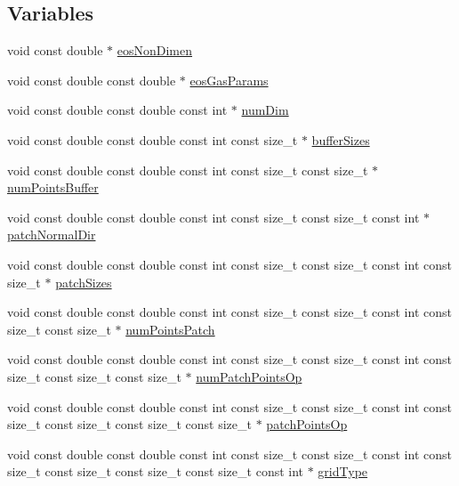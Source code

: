 \subsection*{Variables}
\begin{DoxyCompactItemize}
\item 
void const double $\ast$ \hyperlink{SATKernels_8H_a4278be352a3267641eaae6198afb804a}{eos\+Non\+Dimen}
\item 
void const double const double $\ast$ \hyperlink{SATKernels_8H_ac8bfd00975838fc342c281f3fd053090}{eos\+Gas\+Params}
\item 
void const double const double const int $\ast$ \hyperlink{SATKernels_8H_a680185db8546de161968dabace9e94f1}{num\+Dim}
\item 
void const double const double const int const size\+\_\+t $\ast$ \hyperlink{SATKernels_8H_a74eeadd5b4c053a55bbae02e9e6d690d}{buffer\+Sizes}
\item 
void const double const double const int const size\+\_\+t const size\+\_\+t $\ast$ \hyperlink{SATKernels_8H_a763eadbfec63ff273e2d7b16b0b05974}{num\+Points\+Buffer}
\item 
void const double const double const int const size\+\_\+t const size\+\_\+t const int $\ast$ \hyperlink{SATKernels_8H_a64cccc8cf13f56aec2b85bc30d83e456}{patch\+Normal\+Dir}
\item 
void const double const double const int const size\+\_\+t const size\+\_\+t const int const size\+\_\+t $\ast$ \hyperlink{SATKernels_8H_aab9865bc07ba94e79eb63231f82f4d13}{patch\+Sizes}
\item 
void const double const double const int const size\+\_\+t const size\+\_\+t const int const size\+\_\+t const size\+\_\+t $\ast$ \hyperlink{SATKernels_8H_a5daa362dd0f031e81325fa4199fae8c1}{num\+Points\+Patch}
\item 
void const double const double const int const size\+\_\+t const size\+\_\+t const int const size\+\_\+t const size\+\_\+t const size\+\_\+t $\ast$ \hyperlink{SATKernels_8H_a673536f73773c14c18b2b8924543e4c1}{num\+Patch\+Points\+Op}
\item 
void const double const double const int const size\+\_\+t const size\+\_\+t const int const size\+\_\+t const size\+\_\+t const size\+\_\+t const size\+\_\+t $\ast$ \hyperlink{SATKernels_8H_a8d092af5f58f1962e6b1c2564830eba6}{patch\+Points\+Op}
\item 
void const double const double const int const size\+\_\+t const size\+\_\+t const int const size\+\_\+t const size\+\_\+t const size\+\_\+t const size\+\_\+t const int $\ast$ \hyperlink{SATKernels_8H_aa9206cf7d7248907b29e016938842a7a}{grid\+Type}

\end{DoxyCompactItemize}
